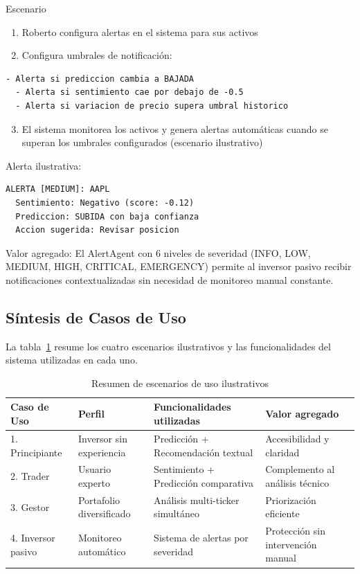   Escenario
  \begin{enumerate}
      \item Roberto configura alertas en el sistema para sus activos
      \item Configura umbrales de notificación:
  \end{enumerate}

  \begin{lstlisting}[language={}]
  - Alerta si prediccion cambia a BAJADA
  - Alerta si sentimiento cae por debajo de -0.5
  - Alerta si variacion de precio supera umbral historico   \end{lstlisting}

  \begin{enumerate}
      \setcounter{enumi}{2}
      \item El sistema monitorea los activos y genera alertas automáticas cuando se superan   
  los umbrales configurados (escenario ilustrativo)
  \end{enumerate}
  

  Alerta ilustrativa:
  \begin{lstlisting}[language={}]
  ALERTA [MEDIUM]: AAPL
  Sentimiento: Negativo (score: -0.12)
  Prediccion: SUBIDA con baja confianza
  Accion sugerida: Revisar posicion   \end{lstlisting}

Valor agregado: El AlertAgent con 6 niveles de severidad (INFO, LOW, MEDIUM, HIGH, 
  CRITICAL, EMERGENCY) permite al inversor pasivo recibir notificaciones contextualizadas sin   necesidad de monitoreo manual constante.

  \subsection{Síntesis de Casos de Uso}

   La tabla~\ref{tab:casos-uso} resume los cuatro escenarios ilustrativos y las funcionalidades   del sistema utilizadas en cada uno.

  \begin{table}[H]
  \centering
  \caption{Resumen de escenarios de uso ilustrativos}
  \label{tab:casos-uso}
  \small
  \begin{tabular}{p{2.5cm}p{3cm}p{4cm}p{3cm}}
  \toprule
  \textbf{Caso de Uso} & \textbf{Perfil} & \textbf{Funcionalidades utilizadas} & \textbf{Valor   agregado} \\
  \midrule
  1. Principiante & Inversor sin experiencia & Predicción + Recomendación textual &
  Accesibilidad y claridad \\
  2. Trader        & Usuario experto          & Sentimiento + Predicción comparativa &        
  Complemento al análisis técnico \\
  3. Gestor        & Portafolio diversificado & Análisis multi-ticker simultáneo &
  Priorización eficiente \\
  4. Inversor pasivo & Monitoreo automático   & Sistema de alertas por severidad & Protección 
  sin intervención manual \\
  \bottomrule
  \end{tabular}
  \end{table}
